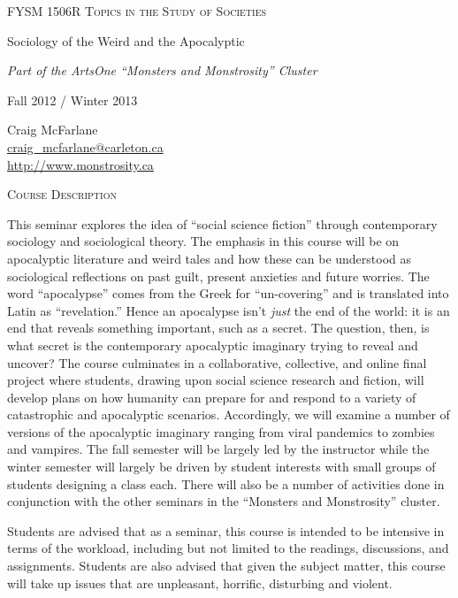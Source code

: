 \documentclass[12pt]{article}
\begin{document}
\thispagestyle{plain}

{\Large \textsc{FYSM 1506R Topics in the Study of Societies}}

{\large Sociology of the Weird and the Apocalyptic}

\textit{Part of the ArtsOne ``Monsters and Monstrosity'' Cluster}

\vspace{.125in}

Fall 2012 / Winter 2013

\vspace{.125in}

Craig McFarlane \\
\href{mailto:craig\_mcfarlane@carleton.ca}{craig\_mcfarlane@carleton.ca} \\
\href{http://www.monstrosity.ca}{http://www.monstrosity.ca}

\vspace{.25in}

{\Large \textsc{Course Description}}

This seminar explores the idea of ``social science fiction'' through contemporary sociology and sociological theory. The emphasis in this course will be on apocalyptic literature and weird tales and how these can be understood as sociological reflections on past guilt, present anxieties and future worries. The word ``apocalypse'' comes from the Greek for ``un-covering'' and is translated into Latin as ``revelation.'' Hence an apocalypse isn't \textit{just} the end of the world: it is an end that reveals something important, such as a secret. The question, then, is what secret is the contemporary apocalyptic imaginary trying to reveal and uncover? The course culminates in a collaborative, collective, and online final project where students, drawing upon social science research and fiction, will develop plans on how humanity can prepare for and respond to a variety of catastrophic and apocalyptic scenarios. Accordingly, we will examine a number of versions of the apocalyptic imaginary ranging from viral pandemics to zombies and vampires. The fall semester will be largely led by the instructor while the winter semester will largely be driven by student interests with small groups of students designing a class each. There will also be a number of activities done in conjunction with the other seminars in the ``Monsters and Monstrosity'' cluster.

Students are advised that as a seminar, this course is intended to be intensive in terms of the workload, including but not limited to the readings, discussions, and assignments. Students are also advised that given the subject matter, this course will take up issues that are unpleasant, horrific, disturbing and violent.
\end{document}
